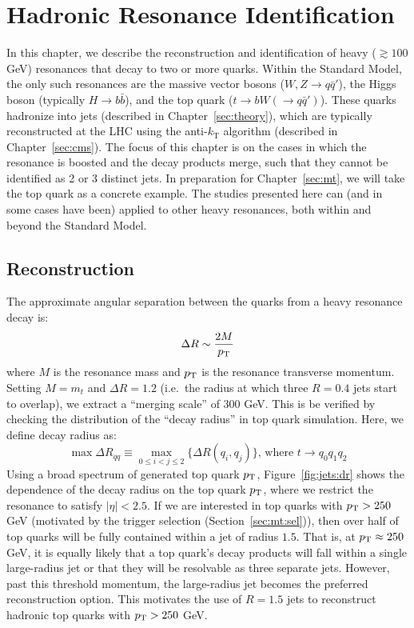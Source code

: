 \chapter{Hadronic Resonance Identification}
\label{sec:jets}

In this chapter, we describe the reconstruction and identification of heavy ($\gtrsim 100$ GeV) resonances that decay to two or more quarks.
Within the Standard Model, the only such resonances are the massive vector bosons ($W,Z\rightarrow q\bar{q}'$), the Higgs boson (typically $H\rightarrow b\bar{b}$), and the top quark ($t\rightarrow bW(\rightarrow q\bar{q}')$).
These quarks hadronize into jets (described in Chapter~\ref{sec:theory}), which are typically reconstructed at the LHC using the anti-$k_\mathrm{T}$ algorithm (described in Chapter~\ref{sec:cms}).
The focus of this chapter is on the cases in which the resonance is boosted and the decay products merge, such that they cannot be identified as 2 or 3 distinct jets.
In preparation for Chapter~\ref{sec:mt}, we will take the top quark as a concrete example.
The studies presented here can (and in some cases have been) applied to other heavy resonances, both within and beyond the Standard Model.

\section{Reconstruction}
\label{sec:jets:reco}

The approximate angular separation between the quarks from a heavy resonance decay is\needcite:
\begin{equation}
    \Delta R \sim \frac{2M}{p_\mathrm{T}}
\end{equation}
where $M$ is the resonance mass and $p_\mathrm{T}$ is the resonance transverse momentum.
Setting $M=m_t$ and $\Delta R=1.2$ (i.e.~the radius at which three $R=0.4$ jets start to overlap), we extract a ``merging scale'' of $300$ GeV.  
This is be verified by checking the distribution of the ``decay radius'' in top quark simulation.
Here, we define decay radius as: 
\begin{equation}
    \max\Delta R_{qq} \equiv \displaystyle\max_{0\leq i < j \leq 2} \{\Delta R(q_i,q_j)\} \text{, where } t\rightarrow q_0q_1q_2
\end{equation}
Using a broad spectrum of generated top quark $p_\mathrm{T}$, Figure~\ref{fig:jets:dr} shows the dependence of the decay radius on the top quark $p_\mathrm{T}$, where we restrict the resonance to satisfy $|\eta|<2.5$.
If we are interested in top quarks with $p_\mathrm{T}>250$ GeV (motivated by the trigger selection (Section~\ref{sec:mt:sel})), then over half of top quarks will be fully contained within a jet of radius $1.5$.
That is, at $p_\mathrm{T}\approx 250$ GeV, it is equally likely that a top quark's decay products will fall within a single large-radius jet or that they will be resolvable as three separate jets. 
However, past this threshold momentum, the large-radius jet becomes the preferred reconstruction option.
This motivates the use of $R=1.5$ jets to reconstruct hadronic top quarks with $p_\mathrm{T}>250$ GeV. 

